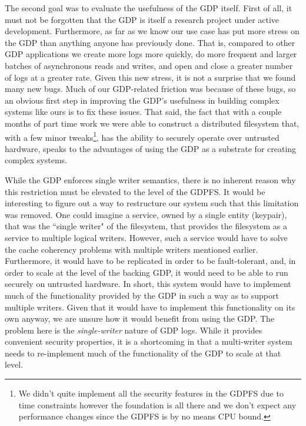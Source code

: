 \documentclass{acm_proc_article-sp}
\begin{document}
The second goal was to evaluate the usefulness of the GDP itself. First of all, it must not be forgotten that the GDP is itself a research project under active development. Furthermore, as far as we know our use case has put more stress on the GDP than anything anyone has previously done. That is, compared to other GDP applications we create more logs more quickly, do more frequent and larger batches of asynchronous reads and writes, and open and close a greater number of logs at a greater rate. Given this new stress, it is not a surprise that we found many new bugs. Much of our GDP-related friction was because of these bugs, so an obvious first step in improving the GDP's usefulness in building complex systems like ours is to fix these issues. That said, the fact that with a couple months of part time work we were able to construct a distributed filesystem that, with a few minor tweaks\footnote{We didn't quite implement all the security features in the GDPFS due to time constraints however the foundation is all there and we don't expect any performance changes since the GDPFS is by no means CPU bound.}, has the ability to securely operate over untrusted hardware, speaks to the advantages of using the GDP as a substrate for creating complex systems.

While the GDP enforces single writer semantics, there is no inherent reason why this restriction must be elevated to the level of the GDPFS. It would be interesting to figure out a way to restructure our system such that this limitation was removed. One could imagine a service, owned by a single entity (keypair), that was the ``single writer" of the filesystem, that provides the filesystem as a service to multiple logical writers. However, such a service would have to solve the cache coherency problems with multiple writers mentioned earlier. Furthermore, it would have to be replicated in order to be fault-tolerant, and, in order to scale at the level of the backing GDP, it would need to be able to run securely on untrusted hardware. In short, this system would have to implement much of the functionality provided by the GDP in such a way as to support multiple writers. Given that it would have to implement this functionality on its own anyway, we are unsure how it would benefit from using the GDP. The problem here is the \emph{single-writer} nature of GDP logs. While it provides convenient security properties, it is a shortcoming in that a multi-writer system needs to re-implement much of the functionality of the GDP to scale at that level.
\end{document}
